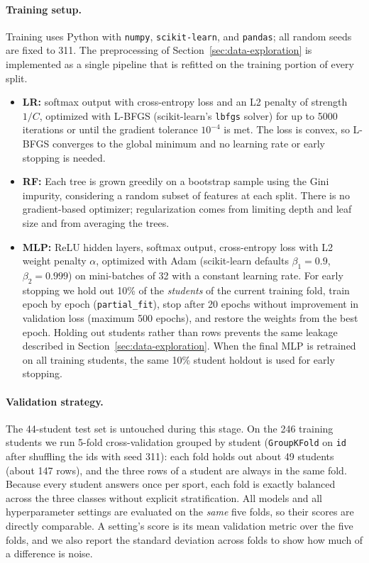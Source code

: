 \documentclass[11pt,titlepage]{article}
\begin{document}
\paragraph{Training setup.}
Training uses Python with \texttt{numpy}, \texttt{scikit-learn}, and
\texttt{pandas}; all random seeds are fixed to 311. The preprocessing of
Section~\ref{sec:data-exploration} is implemented as a single pipeline that is
refitted on the training portion of every split.
\begin{itemize}\itemsep0pt
\item \textbf{LR:} softmax output with cross-entropy loss and an L2 penalty of
strength $1/C$, optimized with L-BFGS (scikit-learn's \texttt{lbfgs} solver) for
up to 5000 iterations or until the gradient tolerance $10^{-4}$ is met. The loss is
convex, so L-BFGS converges to the global minimum and no learning rate or early
stopping is needed.
\item \textbf{RF:} Each tree is grown greedily on a
bootstrap sample using the Gini impurity, considering a random subset of features
at each split. There is no gradient-based optimizer; regularization comes from
limiting depth and leaf size and from averaging the trees.
\item \textbf{MLP:} ReLU hidden layers, softmax output, cross-entropy loss with L2
weight penalty $\alpha$, optimized with Adam (scikit-learn defaults
$\beta_1 = 0.9$, $\beta_2 = 0.999$) on mini-batches of 32 with a constant learning
rate. For early stopping we hold out 10\% of the \emph{students} of the current
training fold, train epoch by epoch (\texttt{partial\_fit}), stop after 20 epochs
without improvement in validation loss (maximum 500 epochs), and restore the
weights from the best epoch. Holding out students rather than rows prevents the
same leakage described in Section~\ref{sec:data-exploration}. When the final MLP is
retrained on all training students, the same 10\% student holdout is used for early
stopping.
\end{itemize}

\paragraph{Validation strategy.}
The 44-student test set is untouched during this stage. On the 246 training
students we run 5-fold cross-validation grouped by student
(\texttt{GroupKFold} on \texttt{id} after shuffling the ids with seed 311): each fold
holds out about 49 students (about 147 rows), and the three rows of a student are
always in the same fold. Because every student answers once per sport, each fold
is exactly balanced across the three classes without explicit stratification.
All models and all hyperparameter settings are evaluated on
the \emph{same} five folds, so their scores are directly comparable. A setting's
score is its mean validation metric over the five folds, and we also report the
standard deviation across folds to show how much of a difference is noise.
\end{document}
